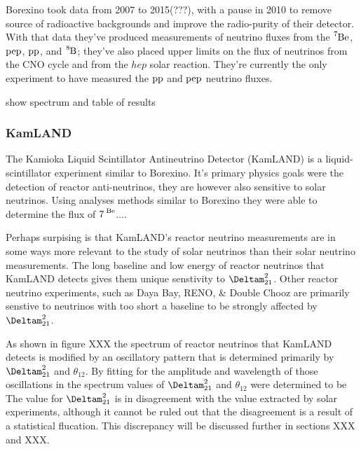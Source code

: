 Borexino took data from 2007 to 2015(???), with a pause in 2010 to remove source
of radioactive backgrounds and improve the radio-purity of their detector.
With that data they've produced measurements of neutrino fluxes from the $\ce{^{7}Be}$,
$\ce{pep}$, $\ce{pp}$, and $\ce{^{8}B}$; they've also placed upper limits on the flux
of neutrinos from the CNO cycle and from the $hep$ solar reaction.
They're currently the only experiment to have measured the $\ce{pp}$ and $\ce{pep}$ neutrino
fluxes.

show spectrum and table of results

\subsubsection{KamLAND}
The Kamioka Liquid Scintillator Antineutrino Detector (KamLAND) is a liquid-scintillator experiment similar to Borexino.
It's primary physics goals were the detection of reactor anti-neutrinos, they are
however also sensitive to solar neutrinos.
Using analyses methods similar to Borexino they were able to determine the flux
of $\ce{7^{Be}}$.... %

Perhaps surpising is that KamLAND's reactor neutrino measurements are in some ways
more relevant to the study of solar neutrinos than their solar neutrino measurements.
The long baseline and low energy of reactor neutrinos that KamLAND detects gives
them unique senstivity to $\Deltam^{2}_{21}$. Other reactor neutrino experiments,
such as Daya Bay, RENO, \& Double Chooz are primarily senstive to neutrinos
with too short a baseline to be strongly affected by $\Deltam^{2}_{21}$.

As shown in figure XXX %
the spectrum of reactor neutrinos that KamLAND detects is modified by an oscillatory
pattern that is determined primarily by $\Deltam^{2}_{21}$ and $\theta_{12}$.
By fitting for the amplitude and wavelength of those oscillations in the
spectrum values of $\Deltam^{2}_{21}$ and $\theta_{12}$ were determined
to be %
The value for $\Deltam^{2}_{21}$ is in disagreement with the value extracted
by solar experiments, although it cannot be ruled out that the disagreement
is a result of a statistical flucation. This discrepancy will be discussed further
in sections XXX and XXX.


